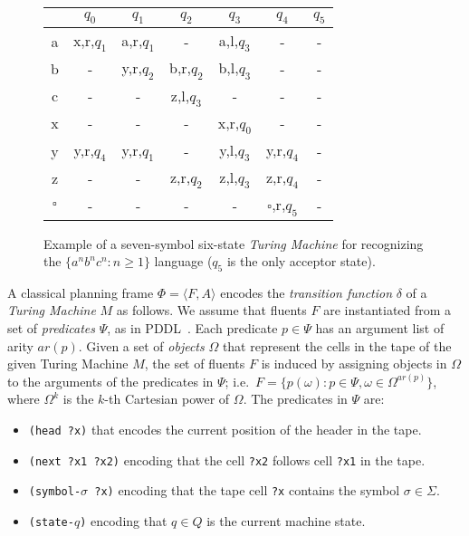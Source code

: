 \documentclass[letterpaper]{article} %
\newcommand{\tup}[1]{{\langle #1 \rangle}}
\begin{document}
\begin{figure}
\begin{center}
    \begin{tabular}{| c | c | c | c | c | c | c |}
    \hline
      & $q_0$ & $q_1$ & $q_2$ & $q_3$ & $q_4$ & \underline{$q_5$} \\ \hline
    a & x,r,$q_1$ & a,r,$q_1$ & - &  a,l,$q_3$ & - & - \\ \hline
    b & - & y,r,$q_2$ & b,r,$q_2$ & b,l,$q_3$ & - & - \\ \hline
    c & - & - & z,l,$q_3$ & - & - & - \\ \hline
    x & - & - & - & x,r,$q_0$ & - & - \\ \hline
    y & y,r,$q_4$ & y,r,$q_1$ & - & y,l,$q_3$ & y,r,$q_4$ & - \\ \hline
    z & - & - & z,r,$q_2$ & z,l,$q_3$ & z,r,$q_4$ & - \\\hline
    $\square$ & - & - & - & - & $\square$,r,$q_5$  & - \\                
    \hline
    \end{tabular}
\end{center}
  \caption{\small Example of a seven-symbol six-state {\em Turing Machine} for recognizing the $\{a^nb^nc^n : n \geq 1 \}$ language (\underline{$q_5$} is the only acceptor state).}
  \label{tab:tm-anbncn}
\end{figure}

A classical planning frame $\Phi=\tup{F,A}$ encodes the {\em transition function} $\delta$ of a {\em Turing Machine} $M$ as follows. We assume that fluents $F$ are instantiated from a set of {\em predicates} $\Psi$, as in PDDL~\cite{fox2003pddl2}. Each predicate $p\in\Psi$ has an argument list of arity $ar(p)$. Given a set of {\em objects} $\Omega$ that represent the cells in the tape of the given Turing Machine $M$, the set of fluents $F$ is induced by assigning objects in $\Omega$ to the arguments of the predicates in $\Psi$; i.e.~$F=\{p(\omega):p\in\Psi,\omega\in\Omega^{ar(p)}\}$, where $\Omega^k$ is the $k$-th Cartesian power of $\Omega$. The predicates in $\Psi$ are:
\begin{itemize}
\item {\tt (head ?x)} that encodes the current position of the header in the tape.
\item {\tt (next ?x1 ?x2)} encoding that the cell {\tt ?x2} follows cell {\tt ?x1} in the tape.
\item {\tt (symbol-$\sigma$ ?x)} encoding that the tape cell {\tt ?x} contains the symbol $\sigma\in\Sigma$.
\item {\tt (state-$q$)} encoding that $q\in Q$ is the current machine state.
\end{itemize}
\end{document}
